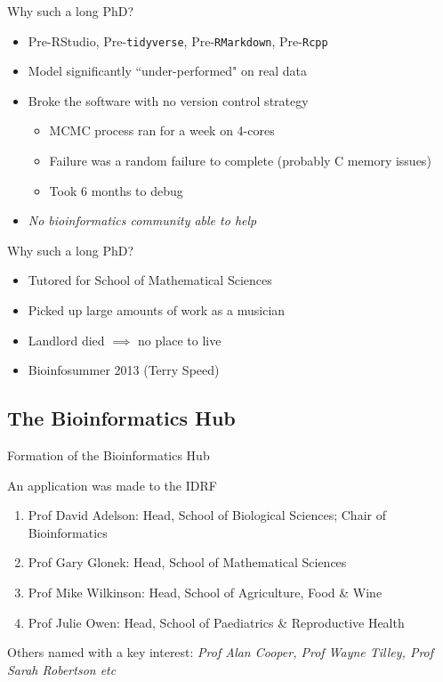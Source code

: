 \documentclass[11pt]{beamer}
\begin{document}
\begin{frame}{Why such a long PhD?}

	\begin{itemize}
		\item Pre-RStudio, Pre-\texttt{tidyverse}, Pre-\texttt{RMarkdown}, Pre-\texttt{Rcpp}
		\item Model significantly ``under-performed" on real data
		\item Broke the software with no version control strategy 
		\begin{itemize}
			\item MCMC process ran for a week on 4-cores 
			\item Failure was a random failure to complete (probably C memory issues)
			\item Took 6 months to debug
		\end{itemize}
		\item \textit{No bioinformatics community able to help}
	\end{itemize}

\end{frame}

\begin{frame}{Why such a long PhD?}

	\begin{itemize}
		\item Tutored for School of Mathematical Sciences
		\item Picked up large amounts of work as a musician
		\item Landlord died $\implies$ no place to live
		\item Bioinfosummer 2013 (Terry Speed)
	\end{itemize}

\end{frame}

\subsection{The Bioinformatics Hub}

\begin{frame}{Formation of the Bioinformatics Hub}

An application was made to the IDRF

\small

	\begin{enumerate}
		\item Prof David Adelson: Head, School of Biological Sciences; Chair of Bioinformatics
		\item Prof Gary Glonek: Head, School of Mathematical Sciences
		\item Prof Mike Wilkinson: Head, School of Agriculture, Food \& Wine
		\item Prof Julie Owen: Head, School of Paediatrics \& Reproductive Health
	\end{enumerate}
	
Others named with a key interest: \textit{Prof Alan Cooper, Prof Wayne Tilley, Prof Sarah Robertson etc}\\[5mm]

\end{frame}
\end{document}

